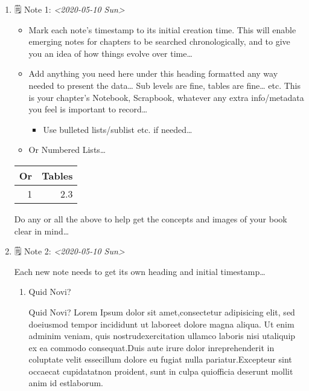 \documentclass[11pt]{article}
\begin{document}
\begin{enumerate}
\item 🗒 Note 1: \textit{<2020-05-10 Sun>}
\label{sec:org1b228ff}

\begin{itemize}
\item Mark each note's timestamp to its initial creation time. This will enable emerging notes for chapters to be searched chronologically, and to give you an idea of how things evolve over time\ldots{}

\item Add anything you need here under this heading formatted any way needed to present the data\ldots{} Sub levels are fine, tables are fine\ldots{} etc.  This is your chapter's Notebook, Scrapbook, whatever any extra info/metadata you feel is important to record\ldots{}

\begin{itemize}
\item Use bulleted lists/sublist etc. if needed\ldots{}
\end{itemize}

\item Or Numbered Lists\ldots{}
\end{itemize}

\begin{center}
\begin{tabular}{rr}
\hline
Or & Tables\\
\hline
1 & 2.3\\
\hline
\end{tabular}
\end{center}

Do any or all the above to help get the concepts and images of your book clear in mind\ldots{}

\item 🗒 Note 2: \textit{<2020-05-10 Sun>}
\label{sec:orgba91a20}

Each new note needs to get its own heading and initial timestamp\ldots{}

\begin{enumerate}
\item Quid Novi?
\label{sec:orge9a91e2}

Quid Novi? Lorem Ipsum dolor sit amet,consectetur adipisicing elit, sed doeiusmod tempor incididunt ut laboreet dolore magna aliqua. Ut enim adminim veniam, quis nostrudexercitation ullamco laboris nisi utaliquip ex ea commodo consequat.Duis aute irure dolor inreprehenderit in coluptate velit essecillum dolore eu fugiat nulla pariatur.Excepteur sint occaecat cupidatatnon proident, sunt in culpa quiofficia deserunt mollit anim id estlaborum.
\end{enumerate}


\end{enumerate}
\end{document}
